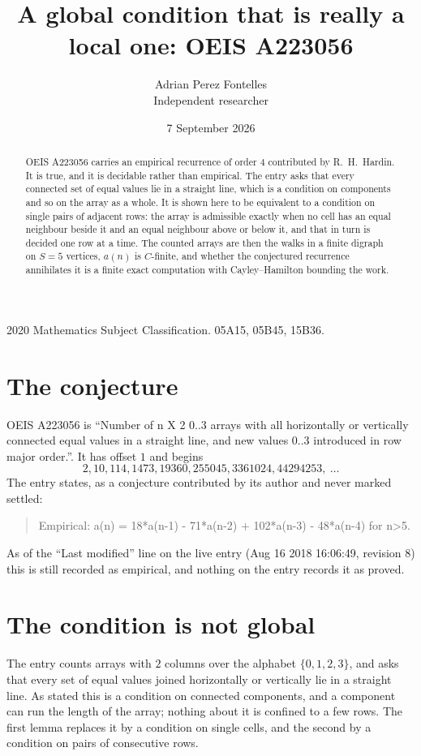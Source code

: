 \documentclass[11pt,a4paper]{article}
\title{A global condition that is really a local one: OEIS A223056}
\author{Adrian Perez Fontelles\\ \small Independent researcher}
\date{7 September 2026}
\theoremstyle{plain}
\theoremstyle{definition}
\begin{document}
\maketitle

\begin{abstract}
OEIS A223056 carries an empirical recurrence of order $4$ contributed by R.~H.~Hardin. It is
true, and it is decidable rather than empirical. The entry asks that every connected set of
equal values lie in a straight line, which is a condition on components and so on the array as
a whole. It is shown here to be equivalent to a condition on single pairs of adjacent rows:
the array is admissible exactly when no cell has an equal neighbour beside it and an equal
neighbour above or below it, and that in turn is decided one row at a time. The counted arrays
are then the walks in a finite digraph on $S=5$ vertices, $a(n)$ is $C$-finite, and whether
the conjectured recurrence annihilates it is a finite exact computation with Cayley--Hamilton
bounding the work.
\end{abstract}

\noindent\small 2020 Mathematics Subject Classification. 05A15, 05B45, 15B36.\normalsize

\section{The conjecture}

OEIS A223056 is ``Number of n X 2 0..3 arrays with all horizontally or vertically connected equal values in a straight line, and new values 0..3 introduced in row major order.''. It has offset $1$ and begins
\[
2, 10, 114, 1473, 19360, 255045, 3361024, 44294253,\ \dots
\]
The entry states, as a conjecture contributed by its author and never marked settled:
\begin{quote}
Empirical: a(n) = 18*a(n-1) - 71*a(n-2) + 102*a(n-3) - 48*a(n-4) for n>5.
\end{quote}
As of the ``Last modified'' line on the live entry (Aug 16 2018 16:06:49, revision 8) this is still
recorded as empirical, and nothing on the entry records it as proved.

\section{The condition is not global}

The entry counts arrays with $2$ columns over the alphabet $\{0,1,2,3\}$, and asks that every set of equal values joined horizontally or vertically lie in a straight line. As stated this is a condition on connected components, and a component can run the length of the array; nothing about it is confined to a few rows. The first lemma replaces it by a condition on single cells, and the second by a condition on pairs of consecutive rows.
\end{document}
